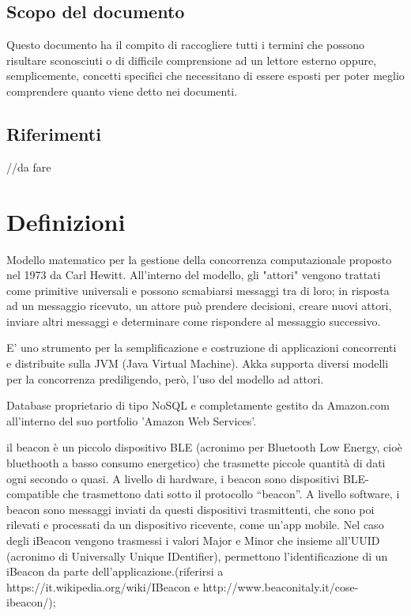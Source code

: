 \documentclass{scalatekids-article}
\begin{document}
\subsection{Scopo del documento}
Questo documento ha il compito di raccogliere tutti i termini che possono risultare sconosciuti o di difficile comprensione ad un lettore esterno oppure, semplicemente, concetti specifici che necessitano di essere esposti per poter meglio comprendere quanto viene detto nei documenti.
\subsection{Riferimenti} //da fare
\newpage
\section{Definizioni}


 Modello matematico per la gestione della concorrenza computazionale proposto nel 1973 da Carl Hewitt.
All'interno del modello, gli "attori" vengono trattati come primitive universali e possono scmabiarsi messaggi tra di loro; in risposta ad un messaggio ricevuto, un attore può prendere decisioni, creare nuovi attori, inviare altri messaggi e determinare come rispondere al messaggio successivo.

 E' uno strumento per la semplificazione e costruzione di applicazioni concorrenti e distribuite sulla JVM (Java Virtual Machine). Akka supporta diversi modelli per la concorrenza prediligendo, però, l'uso del modello ad attori.

 Database proprietario di tipo NoSQL e completamente gestito da Amazon.com all'interno del suo portfolio 'Amazon Web Services'.


 il beacon è un piccolo dispositivo BLE (acronimo per Bluetooth Low Energy, cioè bluethooth a basso consumo energetico) che trasmette piccole quantità di dati ogni secondo o quasi.  A livello di hardware, i beacon sono dispositivi BLE-compatible che trasmettono dati sotto il protocollo “beacon”.
A livello software, i beacon sono messaggi inviati da questi dispositivi trasmittenti, che sono poi rilevati e processati da un dispositivo ricevente, come un’app mobile. Nel caso degli iBeacon vengono trasmessi i valori Major e Minor che insieme all’UUID (acronimo di Universally Unique IDentifier), permettono l’identificazione di un iBeacon da parte dell’applicazione.(riferirsi a https://it.wikipedia.org/wiki/IBeacon e http://www.beaconitaly.it/cose-ibeacon/);
\end{document}
